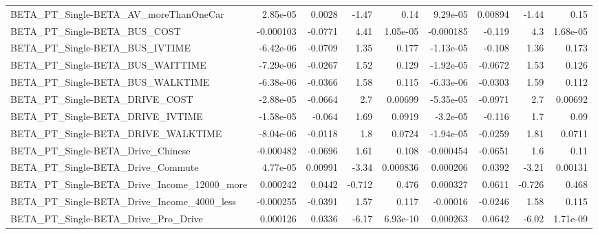 \begin{tabular}{lrrrrrrrr}
BETA\_PT\_Single-BETA\_AV\_moreThanOneCar              &    2.85e-05 &       0.0028 &     -1.47 &     0.14 &   9.29e-05 &     0.00894 &        -1.44 &          0.15 \\
BETA\_PT\_Single-BETA\_BUS\_COST                       &   -0.000103 &      -0.0771 &      4.41 & 1.05e-05 &  -0.000185 &      -0.119 &          4.3 &      1.68e-05 \\
BETA\_PT\_Single-BETA\_BUS\_IVTIME                     &   -6.42e-06 &      -0.0709 &      1.35 &    0.177 &  -1.13e-05 &      -0.108 &         1.36 &         0.173 \\
BETA\_PT\_Single-BETA\_BUS\_WAITTIME                   &   -7.29e-06 &      -0.0267 &      1.52 &    0.129 &  -1.92e-05 &     -0.0672 &         1.53 &         0.126 \\
BETA\_PT\_Single-BETA\_BUS\_WALKTIME                   &   -6.38e-06 &      -0.0366 &      1.58 &    0.115 &  -6.33e-06 &     -0.0303 &         1.59 &         0.112 \\
BETA\_PT\_Single-BETA\_DRIVE\_COST                     &   -2.88e-05 &      -0.0664 &       2.7 &  0.00699 &  -5.35e-05 &     -0.0971 &          2.7 &       0.00692 \\
BETA\_PT\_Single-BETA\_DRIVE\_IVTIME                   &   -1.58e-05 &       -0.064 &      1.69 &   0.0919 &   -3.2e-05 &      -0.116 &          1.7 &          0.09 \\
BETA\_PT\_Single-BETA\_DRIVE\_WALKTIME                 &   -8.04e-06 &      -0.0118 &       1.8 &   0.0724 &  -1.94e-05 &     -0.0259 &         1.81 &        0.0711 \\
BETA\_PT\_Single-BETA\_Drive\_Chinese                  &   -0.000482 &      -0.0696 &      1.61 &    0.108 &  -0.000454 &     -0.0651 &          1.6 &          0.11 \\
BETA\_PT\_Single-BETA\_Drive\_Commute                  &    4.77e-05 &      0.00991 &     -3.34 & 0.000836 &   0.000206 &      0.0392 &        -3.21 &       0.00131 \\
BETA\_PT\_Single-BETA\_Drive\_Income\_12000\_more        &    0.000242 &       0.0442 &    -0.712 &    0.476 &   0.000327 &      0.0611 &       -0.726 &         0.468 \\
BETA\_PT\_Single-BETA\_Drive\_Income\_4000\_less         &   -0.000255 &      -0.0391 &      1.57 &    0.117 &   -0.00016 &     -0.0246 &         1.58 &         0.115 \\
BETA\_PT\_Single-BETA\_Drive\_Pro\_Drive                &    0.000126 &       0.0336 &     -6.17 & 6.93e-10 &   0.000263 &      0.0642 &        -6.02 &      1.71e-09 \\

\end{tabular}
